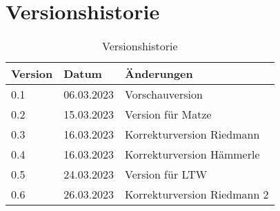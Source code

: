 \section*{Versionshistorie}

\begin{table}[H]
  \centering
  \begin{tabular}{lll}
    \toprule
    \textbf{Version} & \textbf{Datum} & \textbf{Änderungen}       \\
    \midrule
    0.1              & 06.03.2023     & Vorschauversion           \\
    0.2              & 15.03.2023     & Version für Matze         \\
    0.3              & 16.03.2023     & Korrekturversion Riedmann \\
    0.4              & 16.03.2023     & Korrekturversion Hämmerle \\
    0.5              & 24.03.2023     & Version für LTW           \\
    0.6              & 26.03.2023     & Korrekturversion Riedmann 2          \\
    \bottomrule
  \end{tabular}
  \caption{Versionshistorie}
  \label{tab:versionshistorie}
\end{table}
